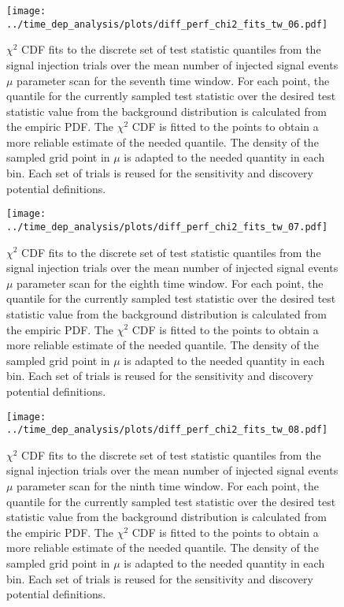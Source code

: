 \begin{figure}[H]
  \centering
  \texttt{[image: ../time\_dep\_analysis/plots/diff\_perf\_chi2\_fits\_tw\_06.pdf]}
  \caption[$\chi^2$ CDF fits for the 7th time window differential performance]{
     $\chi^2$ CDF fits to the discrete set of test statistic quantiles from the signal injection trials over the mean number of injected signal events $\mu$ parameter scan for the seventh time window.
     For each point, the quantile for the currently sampled test statistic over the desired test statistic value from the background distribution is calculated from the empiric PDF.
     The $\chi^2$ CDF is fitted to the points to obtain a more reliable estimate of the needed quantile.
     The density of the sampled grid point in $\mu$ is adapted to the needed quantity in each bin.
     Each set of trials is reused for the sensitivity and discovery potential definitions.
  }
  \label{fig:diff_perf_chi2_fits_tw_06}
\end{figure}
\begin{figure}[H]
  \centering
  \texttt{[image: ../time\_dep\_analysis/plots/diff\_perf\_chi2\_fits\_tw\_07.pdf]}
  \caption[$\chi^2$ CDF fits for the 8th time window differential performance]{
     $\chi^2$ CDF fits to the discrete set of test statistic quantiles from the signal injection trials over the mean number of injected signal events $\mu$ parameter scan for the eighth time window.
     For each point, the quantile for the currently sampled test statistic over the desired test statistic value from the background distribution is calculated from the empiric PDF.
     The $\chi^2$ CDF is fitted to the points to obtain a more reliable estimate of the needed quantile.
     The density of the sampled grid point in $\mu$ is adapted to the needed quantity in each bin.
     Each set of trials is reused for the sensitivity and discovery potential definitions.
  }
  \label{fig:diff_perf_chi2_fits_tw_07}
\end{figure}
\begin{figure}[H]
  \centering
  \texttt{[image: ../time\_dep\_analysis/plots/diff\_perf\_chi2\_fits\_tw\_08.pdf]}
  \caption[$\chi^2$ CDF fits for the 9th time window differential performance]{
     $\chi^2$ CDF fits to the discrete set of test statistic quantiles from the signal injection trials over the mean number of injected signal events $\mu$ parameter scan for the ninth time window.
     For each point, the quantile for the currently sampled test statistic over the desired test statistic value from the background distribution is calculated from the empiric PDF.
     The $\chi^2$ CDF is fitted to the points to obtain a more reliable estimate of the needed quantile.
     The density of the sampled grid point in $\mu$ is adapted to the needed quantity in each bin.
     Each set of trials is reused for the sensitivity and discovery potential definitions.
  }
  \label{fig:diff_perf_chi2_fits_tw_08}
\end{figure}
